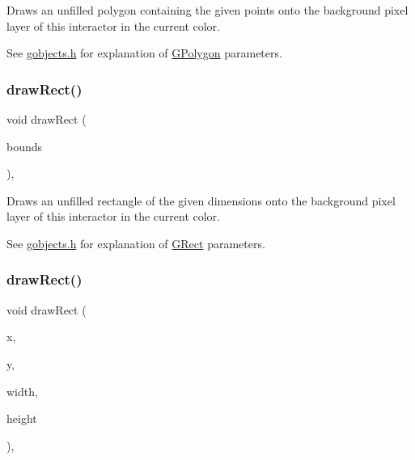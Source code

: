 Draws an unfilled polygon containing the given points onto the background pixel layer of this interactor in the current color. 

See \mbox{\hyperlink{gobjects_8h_source}{gobjects.\+h}} for explanation of \mbox{\hyperlink{classsgl_1_1GPolygon}{G\+Polygon}} parameters. \mbox{\label{classsgl_1_1GDrawingSurface_a3dd4cc5891149dfc36746264f7289877}} 
\subsubsection{\texorpdfstring{draw\+Rect()}{drawRect()}\hspace{0.1cm}{\footnotesize\ttfamily [1/2]}}
{\footnotesize\ttfamily void draw\+Rect (\begin{DoxyParamCaption}\item[{const \mbox{\hyperlink{structsgl_1_1GRectangle}{G\+Rectangle}} \&}]{bounds }\end{DoxyParamCaption})\hspace{0.3cm}{\ttfamily [virtual]}, {\ttfamily [inherited]}}



Draws an unfilled rectangle of the given dimensions onto the background pixel layer of this interactor in the current color. 

See \mbox{\hyperlink{gobjects_8h_source}{gobjects.\+h}} for explanation of \mbox{\hyperlink{classsgl_1_1GRect}{G\+Rect}} parameters. \mbox{\label{classsgl_1_1GDrawingSurface_a4148e770ffc5474153aadd4814dbd708}} 
\subsubsection{\texorpdfstring{draw\+Rect()}{drawRect()}\hspace{0.1cm}{\footnotesize\ttfamily [2/2]}}
{\footnotesize\ttfamily void draw\+Rect (\begin{DoxyParamCaption}\item[{double}]{x,  }\item[{double}]{y,  }\item[{double}]{width,  }\item[{double}]{height }\end{DoxyParamCaption})\hspace{0.3cm}{\ttfamily [virtual]}, {\ttfamily [inherited]}}




